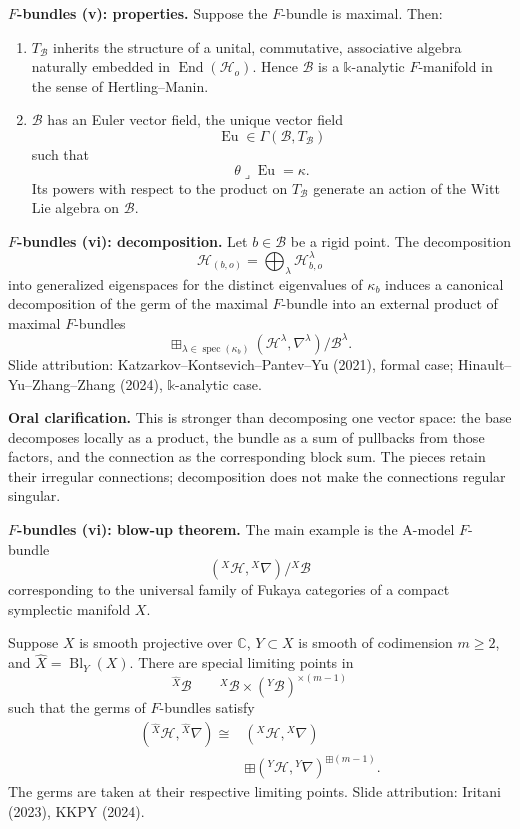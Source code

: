 \medskip\noindent
\textbf{$F$-bundles (v): properties.}
Suppose the $F$-bundle is maximal. Then:
\begin{enumerate}
\item $T_{\mathcal B}$ inherits the structure
of a unital, commutative, associative algebra
naturally embedded in
$\operatorname{End}(\mathcal H_o)$.
Hence $\mathcal B$ is a $\mathbb k$-analytic
$F$-manifold in the sense of
Hertling--Manin.
\item $\mathcal B$ has an Euler vector field,
the unique vector field
$$
\operatorname{Eu}\in
\Gamma(\mathcal B,T_{\mathcal B})
$$
such that
$$
\theta\mathbin{\lrcorner}
\operatorname{Eu}=\kappa.
$$
Its powers with respect to the product on
$T_{\mathcal B}$ generate an action of the
Witt Lie algebra on $\mathcal B$.
\end{enumerate}

\medskip\noindent
\textbf{$F$-bundles (vi): decomposition.}
Let $b\in\mathcal B$ be a rigid point.
The decomposition
$$
\mathcal H_{(b,o)}=
\bigoplus_\lambda\mathcal H^\lambda_{b,o}
$$
into generalized eigenspaces for the
distinct eigenvalues of $\kappa_b$ induces
a canonical decomposition of the germ of
the maximal $F$-bundle into an external
product of maximal $F$-bundles
$$
\mathop{\boxplus}_{
\lambda\in\operatorname{spec}(\kappa_b)}
(\mathcal H^\lambda,\nabla^\lambda)
/\mathcal B^\lambda.
$$
Slide attribution:
Katzarkov--Kontsevich--Pantev--Yu (2021),
formal case; Hinault--Yu--Zhang--Zhang
(2024), $\mathbb k$-analytic case.

\textbf{Oral clarification.}
This is stronger than decomposing one
vector space: the base decomposes locally
as a product, the bundle as a sum of
pullbacks from those factors, and the
connection as the corresponding block
sum. The pieces retain their irregular
connections; decomposition does not make
the connections regular singular.

\medskip\noindent
\textbf{$F$-bundles (vi): blow-up theorem.}
The main example is the A-model $F$-bundle
$$
({}^X\mathcal H,{}^X\nabla)/{}^X\mathcal B
$$
corresponding to the universal family of
Fukaya categories of a compact symplectic
manifold $X$.

Suppose $X$ is smooth projective over
$\mathbb C$, $Y\subset X$ is smooth of
codimension $m\geq2$, and
$\widehat X=\operatorname{Bl}_Y(X)$.
There are special limiting points in
$$
{}^{\widehat X}\mathcal B
\qquad
{}^X\mathcal B\times
({}^Y\mathcal B)^{\times(m-1)}
$$
such that the germs of $F$-bundles satisfy
$$
\begin{aligned}
({}^{\widehat X}\mathcal H,
{}^{\widehat X}\nabla)
\cong{}&({}^X\mathcal H,{}^X\nabla)\\
&\boxplus
({}^Y\mathcal H,{}^Y\nabla)
^{\boxplus(m-1)}.
\end{aligned}
$$
The germs are taken at their respective
limiting points. Slide attribution:
Iritani (2023), KKPY (2024).

